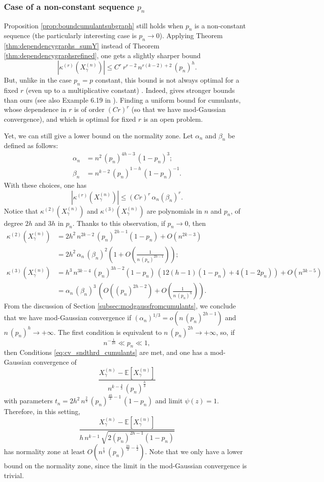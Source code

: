 \documentclass[12pt,a4paper,reqno]{amsart}
\theoremstyle{remark}
\newcommand{\esper}{\mathbb{E}}
\newcommand{\alphan}{\alpha_n}
\newcommand{\betan}{\beta_n}
\newcommand{\SubGraph}{X^{(n)}}
\begin{document}
\subsubsection{Case of a non-constant sequence $p_n$}
\label{subsec:nonconstantproba}
Proposition \ref{prop:boundcumulantsubgraph} still holds when $p_n$ is a non-constant sequence (the particularly interesting case is $p_n \to 0$). Applying Theorem \ref{thm:dependencygraphs_sumY} instead of Theorem \ref{thm:dependencygraphsrefined}, one gets a slightly sharper bound 
$$\left| \kappa^{(r)} (\SubGraph_\gamma) \right| \le C^{r} \,r^{r-2} \,n^{r(k-2)+2}\, (p_n)^h.$$
But, unlike in the case $p_n=p$ constant, this bound is not always optimal for a fixed $r$ (even up to a multiplicative constant) . Indeed, \cite[Lemma 6.17]{JLR00} gives stronger bounds than ours (see also Example 6.19 in \cite{JLR00}). Finding a uniform bound for cumulants, whose dependence in $r$ is of order $(Cr)^r$  (so that we have mod-Gaussian convergence), and which is optimal for fixed $r$ is an open problem.\bigskip

Yet, we can still give a lower bound on the normality zone. Let $\alphan$ and $\betan$ be defined as follows:
\begin{align*}
    \alphan &= n^2 \,(p_n)^{4h-3} \,(1-p_n)^3;\\
    \betan &=n^{k-2}\, (p_n)^{1-h}\, (1-p_{n})^{-1}.
\end{align*}
With these choices, one has
$$\left| \kappa^{(r)} (\SubGraph_\gamma) \right| \le (Cr)^r\, \alphan (\betan)^r.$$
Notice that $\kappa^{(2)}(\SubGraph_\gamma)$ and $\kappa^{(3)}(\SubGraph_\gamma)$ are polynomials in $n$ and $p_n$, of degree $2h$ and $3h$ in $p_n$. Thanks to this observation, if $p_n \to 0$, then
\begin{align*}
\kappa^{(2)}(\SubGraph_\gamma) &= 2h^2\,n^{2k-2}\,(p_n)^{2h-1}(1-p_n) + O(n^{2k-3}) \\
&= 2h^2\,\alphan\,(\betan)^2 \left(1+O\!\left(\frac{1}{n\,(p_n)^{2h-1}}\right)\right) ;\\
\kappa^{(3)}(\SubGraph_\gamma) &= h^3\,n^{3k-4}\,(p_n)^{3h-2}(1-p_n)\,(12 (h-1) (1-p_n) + 4 (1-2p_n)) + O(n^{3k-5})\\
&=\alphan\,(\betan)^3\,\left(O((p_n)^{2h-2})+O\!\left(\frac{1}{n\,(p_n)^{h}}\right)\right).
\end{align*}
From the discussion of Section \ref{subsec:modgaussfromcumulants}, we conclude that we have mod-Gaussian convergence 
if $(\alphan)^{1/3}=o(n\,(p_n)^{2h-1})$ and $n\,(p_n)^h \to +\infty$. The first condition is equivalent to $n\,(p_n)^{2h} \to +\infty$, so, if
$$ n^{-\frac{1}{2h}} \ll p_n \ll 1 ,$$
then Conditions \eqref{eq:cv_sndthrd_cumulants} are met, and one has a mod-Gaussian convergence of 
$$\frac{\SubGraph_\gamma-\esper[\SubGraph_\gamma]}{n^{k-\frac{4}{3}}\,(p_n)^{\frac{h}{3}}}$$
with parameters $t_n = 2h^2\,n^{\frac{2}{3}}\,(p_n)^{\frac{4h}{3}-1}\,(1-p_n)$ and limit $\psi(z)=1$. Therefore, in this setting, 
$$\frac{\SubGraph_\gamma-\esper[\SubGraph_\gamma]}{h\,n^{k-1}\,\sqrt{2(p_n)^{2h-1}(1-p_n)}}$$
has normality zone at least $O(n^{\frac{1}{3}}\,(p_n)^{\frac{2h}{3}-\frac{1}{2}})$.
Note that we only have a lower bound on the normality zone,
since the limit in the mod-Gaussian convergence is trivial.
\end{document}
